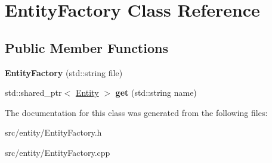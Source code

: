 \hypertarget{classEntityFactory}{\section{Entity\-Factory Class Reference}
\label{classEntityFactory}
}
\subsection*{Public Member Functions}
\begin{DoxyCompactItemize}
\item 
\hypertarget{classEntityFactory_a69576e4b61858825b5892f05575fb423}{{\bfseries Entity\-Factory} (std\-::string file)}\label{classEntityFactory_a69576e4b61858825b5892f05575fb423}

\item 
\hypertarget{classEntityFactory_ade262eed788648b710e64d332449a759}{std\-::shared\-\_\-ptr$<$ \hyperlink{classEntity}{Entity} $>$ {\bfseries get} (std\-::string name)}\label{classEntityFactory_ade262eed788648b710e64d332449a759}

\end{DoxyCompactItemize}


The documentation for this class was generated from the following files\-:\begin{DoxyCompactItemize}
\item 
src/entity/Entity\-Factory.\-h\item 
src/entity/Entity\-Factory.\-cpp\end{DoxyCompactItemize}
